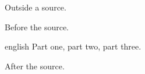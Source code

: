 \documentclass{beamer}
\begin{document}
\begin{hearah}Outside a source.\end{hearah}
\begin{mekor}
\begin{hearah}Before the source.\end{hearah}
\begin{mekorlang}{english}{}
Part one, \mekorbreak part two, \mekorbreak part three.
\end{mekorlang}
\begin{hearah}After the source.\end{hearah}
\end{mekor}
\end{document}
